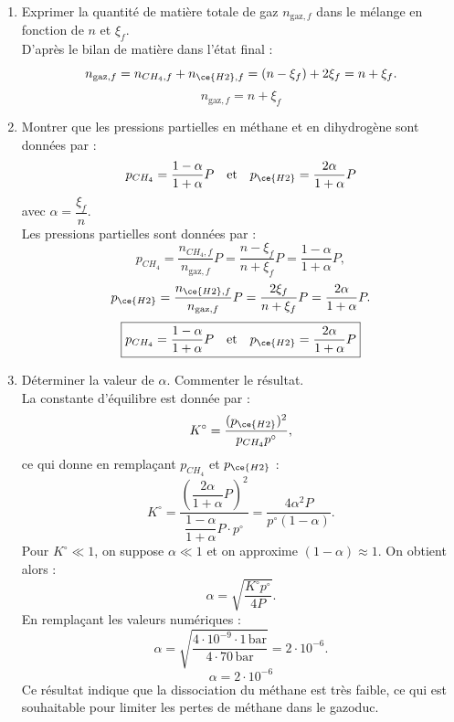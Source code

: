 \documentclass[a4paper,10pt,notitlepage,oneside]{article}
\theoremstyle{plain}
\begin{document}
\begin{enumerate}
    \item Exprimer la quantité de matière totale de gaz $n_{\text{gaz},f}$ dans le mélange en fonction de $n$ et $\xi_f$.\\
    D'après le bilan de matière dans l'état final :
    \[
    n_{\text{gaz},f} = n_{CH_4,f} + n_{\ce{H2},f} = (n - \xi_f) + 2 \xi_f = n + \xi_f.
    \]
    \begin{equation*}
        \boxed{n_{\text{gaz},f} = n + \xi_f}
    \end{equation*}

    \item Montrer que les pressions partielles en méthane et en dihydrogène sont données par : 
    \[
    p_{CH_4} = \dfrac{1 - \alpha}{1 + \alpha} P \quad \text{et} \quad p_{\ce{H2}} = \dfrac{2\alpha}{1 + \alpha} P
    \]
    avec $\alpha = \dfrac{\xi_f}{n}$.\\
    Les pressions partielles sont données par :
    \[
    p_{CH_4} = \dfrac{n_{CH_4,f}}{n_{\text{gaz},f}} P = \dfrac{n - \xi_f}{n + \xi_f} P = \dfrac{1 - \alpha}{1 + \alpha} P,
    \]
    \[
    p_{\ce{H2}} = \dfrac{n_{\ce{H2},f}}{n_{\text{gaz},f}} P = \dfrac{2 \xi_f}{n + \xi_f} P = \dfrac{2\alpha}{1 + \alpha} P.
    \]
    \begin{equation*}
        \boxed{p_{CH_4} = \dfrac{1 - \alpha}{1 + \alpha} P \quad \text{et} \quad p_{\ce{H2}} = \dfrac{2\alpha}{1 + \alpha} P}
    \end{equation*}

    \item Déterminer la valeur de $\alpha$. Commenter le résultat.\\
    La constante d'équilibre est donnée par :
    \[
    K^\circ = \dfrac{(p_{\ce{H2}})^2}{p_{CH_4} p^\circ},
    \]
    ce qui donne en remplaçant $p_{CH_4}$ et $p_{\ce{H2}}$ :
    \[
    K^\circ = \dfrac{\left(\dfrac{2\alpha}{1+\alpha} P\right)^2}{\dfrac{1-\alpha}{1+\alpha} P \cdot p^\circ} = \dfrac{4\alpha^2 P}{p^\circ(1-\alpha)}.
    \]
    Pour $K^\circ \ll 1$, on suppose $\alpha \ll 1$ et on approxime $(1-\alpha) \approx 1$. On obtient alors :
    \[
    \alpha = \sqrt{\dfrac{K^\circ p^\circ}{4P}}.
    \]
    En remplaçant les valeurs numériques :
    \[
    \alpha = \sqrt{\dfrac{4 \cdot 10^{-9} \cdot 1 \, \text{bar}}{4 \cdot 70 \, \text{bar}}} = 2 \cdot 10^{-6}.
    \]
    \begin{equation*}
        \boxed{\alpha = 2 \cdot 10^{-6}}
    \end{equation*}
    Ce résultat indique que la dissociation du méthane est très faible, ce qui est souhaitable pour limiter les pertes de méthane dans le gazoduc.


\end{enumerate}
\end{document}
